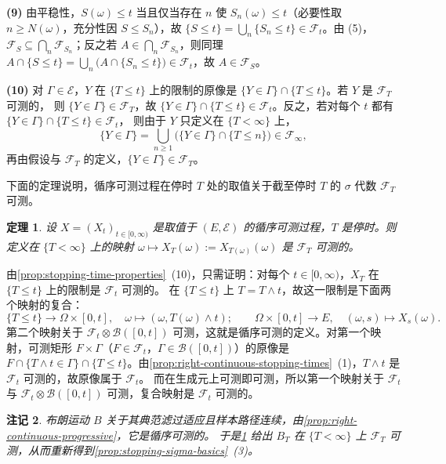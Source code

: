 \documentclass[UTF8,11pt,a4paper,oneside,fontset=fandol]{ctexrep}
\makeatletter
\numberwithin{equation}{section}
\theoremstyle{zhthm}
\newtheorem{theorem}{定理}[section]
\newtheorem{remark}[theorem]{注记}
\renewenvironment{proof}[1][\proofname]{\par
  \pushQED{\qed}%
  \normalfont\topsep6\p@\@plus6\p@\relax
  \trivlist
  \item[\hskip\labelsep\bfseries#1\hspace{0.5em}]\ignorespaces
}{%
  \popQED\endtrivlist\@endpefalse
}
\renewcommand{\proofname}{证明}
\newcommand{\B}{\mathcal{B}}
\newcommand{\F}{\mathcal{F}}
\makeatother
\begin{document}
\begin{proof}
\textbf{(9)} 由平稳性，$S(\omega)\le t$ 当且仅当存在 $n$ 使 $S_n(\omega)\le t$（必要性取 $n\ge N(\omega)$，充分性因 $S\le S_n$），故
$\{S\le t\}=\bigcup_n\{S_n\le t\}\in\F_t$。由 (5)，$\F_S\subseteq\bigcap_n\F_{S_n}$；反之若 $A\in\bigcap_n\F_{S_n}$，则同理
$A\cap\{S\le t\}=\bigcup_n\bigl(A\cap\{S_n\le t\}\bigr)\in\F_t$，故 $A\in\F_S$。

\textbf{(10)} 对 $\Gamma\in\mathcal E$，$Y$ 在 $\{T\le t\}$ 上的限制的原像是 $\{Y\in\Gamma\}\cap\{T\le t\}$。若 $Y$ 是 $\F_T$ 可测的，
则 $\{Y\in\Gamma\}\in\F_T$，故 $\{Y\in\Gamma\}\cap\{T\le t\}\in\F_t$。反之，若对每个 $t$ 都有 $\{Y\in\Gamma\}\cap\{T\le t\}\in\F_t$，
则由于 $Y$ 只定义在 $\{T<\infty\}$ 上，
\[
  \{Y\in\Gamma\}=\bigcup_{n\ge1}\bigl(\{Y\in\Gamma\}\cap\{T\le n\}\bigr)\in\F_\infty,
\]
再由假设与 $\F_T$ 的定义，$\{Y\in\Gamma\}\in\F_T$。
\end{proof}

下面的定理说明，循序可测过程在停时 $T$ 处的取值关于截至停时 $T$ 的 $\sigma$ 代数 $\F_T$ 可测。

\begin{theorem}
\label{thm:progressive-at-stopping-time}
设 $X=(X_t)_{t\in[0,\infty)}$ 是取值于 $(E,\mathcal E)$ 的循序可测过程，$T$ 是停时。则定义在 $\{T<\infty\}$ 上的映射
$\omega\mapsto X_T(\omega):=X_{T(\omega)}(\omega)$ 是 $\F_T$ 可测的。
\end{theorem}

\begin{proof}
由\cref{prop:stopping-time-properties}~(10)，只需证明：对每个 $t\in[0,\infty)$，$X_T$ 在 $\{T\le t\}$ 上的限制是 $\F_t$ 可测的。
在 $\{T\le t\}$ 上 $T=T\wedge t$，故这一限制是下面两个映射的复合：
\[
  \{T\le t\}\to\Omega\times[0,t],\quad \omega\mapsto(\omega,T(\omega)\wedge t);\qquad
  \Omega\times[0,t]\to E,\quad (\omega,s)\mapsto X_s(\omega).
\]
第二个映射关于 $\F_t\otimes\B([0,t])$ 可测，这就是循序可测的定义。对第一个映射，可测矩形 $F\times\Gamma$（$F\in\F_t$，$\Gamma\in\B([0,t])$）的原像是
$F\cap\{T\wedge t\in\Gamma\}\cap\{T\le t\}$。由\cref{prop:right-continuous-stopping-times}~(1)，$T\wedge t$ 是 $\F_t$ 可测的，故原像属于 $\F_t$。
而在生成元上可测即可测\cite[定理 1.3.1]{Durrett2019}，所以第一个映射关于 $\F_t$ 与 $\F_t\otimes\B([0,t])$ 可测，复合映射是 $\F_t$ 可测的。
\end{proof}

\begin{remark}
\label{rem:brownian-at-stopping-time}
布朗运动 $B$ 关于其典范滤过适应且样本路径连续，由\cref{prop:right-continuous-progressive}，它是循序可测的。
于是\cref{thm:progressive-at-stopping-time} 给出 $B_T$ 在 $\{T<\infty\}$ 上 $\F_T$ 可测，从而重新得到\cref{prop:stopping-sigma-basics}~(3)。
\end{remark}
\end{document}
